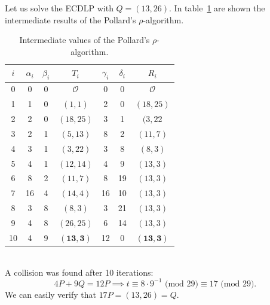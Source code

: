 \documentclass[thesis=M,english]{FITthesis}[2012/10/20]
\theoremstyle{remark}
\theoremstyle{definition}
\begin{document}
\noindent Let us solve the ECDLP with $Q=(13,26)$. In table~\ref{tblRho} are shown the intermediate results of the Pollard's $\rho$-algorithm.
\begin{table}[!h]
\centering
\begin{tabular}{ |c||c|c|c|c|c|c| } 
\hline
$i$ & $\alpha_i$ & $\beta_i$ & $T_i$ & $\gamma_i$ & $\delta_i$ & $R_i$ \\ 
\hline
\hline
0 & 0 & 0 & $\mathcal{O}$ &  0 & 0 & $\mathcal{O}$ \\ \hline
1 & 1 & 0 & $(1,1)$ &  2 & 0 & $(18,25)$ \\ \hline
2 & 2 & 0 & $(18,25)$ &  3 & 1 & $(3,22$ \\ \hline
3 & 2 & 1 & $(5,13)$ &  8 & 2 & $(11,7)$ \\ \hline
4 & 3 & 1 & $(3,22)$ &  3 & 8 & $(8,3)$ \\ \hline
5 & 4 & 1 & $(12,14)$ &  4 & 9 & $(13,3)$ \\ \hline
6 & 8 & 2 & $(11,7)$ &  8 & 19 & $(13,3)$ \\ \hline
7 & 16 & 4 & $(14,4)$ &  16 & 10 & $(13,3)$ \\ \hline
8 & 3 & 8 & $(8,3)$ &  3 & 21 & $(13,3)$ \\ \hline
9 & 4 & 8 & $(26,25)$ &  6 & 14 & $(13,3)$ \\ \hline
10 & 4 & 9 & $\mathbf{(13,3)}$ &  12 & 0 & $\mathbf{(13,3)}$ \\ \hline
\end{tabular}
\caption[Intermediate values of the Pollard's $\rho$-algorithm]{Intermediate values of the Pollard's $\rho$-algorithm.}
\label{tblRho}
\end{table}
\\
\noindent A collision was found after 10 iterations: 
$$
4P + 9Q = 12P \implies t \equiv 8\cdot9^{-1} \text{ (mod $29$)} \equiv 17 \text{ (mod $29$)}. 
$$
We can easily verify that $17P = (13,26) = Q.$
\end{document}
